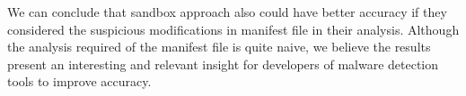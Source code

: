 \begin{obs}{3}{}
 We can conclude that sandbox approach also could have better accuracy if they considered the suspicious modifications in manifest file in their analysis. Although the analysis required of the manifest file is quite naive, we believe the results present an interesting and relevant insight for developers of malware detection tools to improve accuracy.
\end{obs}

